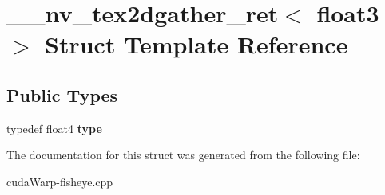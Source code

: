\hypertarget{struct____nv__tex2dgather__ret_3_01float3_01_4}{}\section{\+\_\+\+\_\+nv\+\_\+tex2dgather\+\_\+ret$<$ float3 $>$ Struct Template Reference}
\label{struct____nv__tex2dgather__ret_3_01float3_01_4}
\subsection*{Public Types}
\begin{DoxyCompactItemize}
\item 
typedef float4 {\bfseries type}\hypertarget{struct____nv__tex2dgather__ret_3_01float3_01_4_a39d6606b715b592b69998474bdc76f0b}{}\label{struct____nv__tex2dgather__ret_3_01float3_01_4_a39d6606b715b592b69998474bdc76f0b}

\end{DoxyCompactItemize}


The documentation for this struct was generated from the following file\+:\begin{DoxyCompactItemize}
\item 
cuda\+Warp-\/fisheye.\+cpp\end{DoxyCompactItemize}
